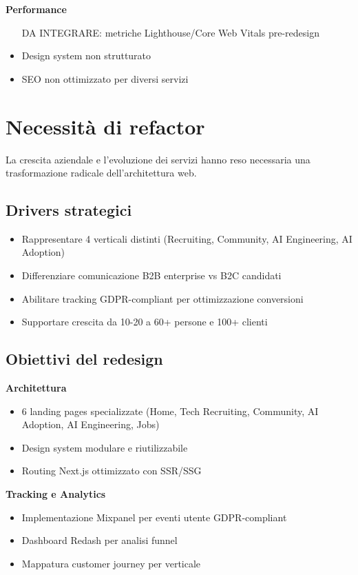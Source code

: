\textbf{Performance}
\begin{itemize}
  \item [DA INTEGRARE: metriche Lighthouse/Core Web Vitals pre-redesign]
  \item Design system non strutturato
  \item SEO non ottimizzato per diversi servizi
\end{itemize}

\section{Necessità di refactor}
La crescita aziendale e l'evoluzione dei servizi hanno reso necessaria una trasformazione radicale dell'architettura web.

\subsection{Drivers strategici}
\begin{itemize}
  \item Rappresentare 4 verticali distinti (Recruiting, Community, AI Engineering, AI Adoption)
  \item Differenziare comunicazione B2B enterprise vs B2C candidati
  \item Abilitare tracking GDPR-compliant per ottimizzazione conversioni
  \item Supportare crescita da 10-20 a 60+ persone e 100+ clienti
\end{itemize}

\subsection{Obiettivi del redesign}
\textbf{Architettura}
\begin{itemize}
  \item 6 landing pages specializzate (Home, Tech Recruiting, Community, AI Adoption, AI Engineering, Jobs)
  \item Design system modulare e riutilizzabile
  \item Routing Next.js ottimizzato con SSR/SSG
\end{itemize}

\textbf{Tracking e Analytics}
\begin{itemize}
  \item Implementazione Mixpanel per eventi utente GDPR-compliant
  \item Dashboard Redash per analisi funnel
  \item Mappatura customer journey per verticale
\end{itemize}

